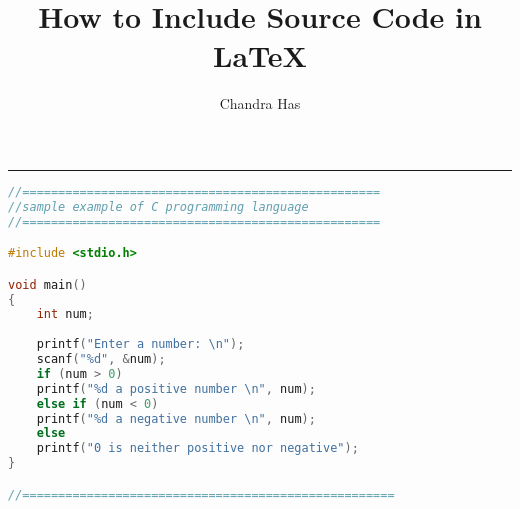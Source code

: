 \documentclass[11pt, a4paper]{article}
\title{How to Include Source Code in \LaTeX}
\author{Chandra Has}\date{}
\begin{document}
\maketitle
\hrule

\lstlistoflistings

\newpage

\begin{lstlisting}[caption=Sample example of C programming language, label=c-sample, style=chstyle, language=C]
//==================================================
//sample example of C programming language
//==================================================

#include <stdio.h>

void main()
{
	int num;
	
	printf("Enter a number: \n");
	scanf("%d", &num);
	if (num > 0)
	printf("%d a positive number \n", num);
	else if (num < 0)
	printf("%d a negative number \n", num);
	else
	printf("0 is neither positive nor negative");
}

//====================================================
\end{lstlisting}


\newpage



\newpage



\newpage



\newpage



\newpage


\end{document}
